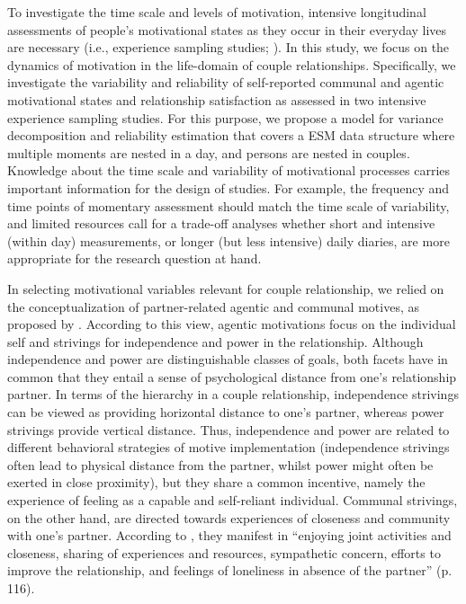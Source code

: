 \documentclass[jou,a4paper,draftfirst]{apa6}\usepackage[]{graphicx}\usepackage[]{color}
\begin{document}
To investigate the time scale and levels of motivation, intensive longitudinal assessments of people’s motivational states as they occur in their everyday lives are necessary (i.e., experience sampling studies; ).
In this study, we focus on the dynamics of motivation in the life-domain of couple relationships. Specifically, we investigate the variability and reliability of self-reported communal and agentic motivational states and relationship satisfaction as assessed in two intensive experience sampling studies. For this purpose, we propose a model for variance decomposition and reliability estimation that covers a ESM data structure where multiple moments are nested in a day, and persons are nested in couples. 
Knowledge about the time scale and variability of motivational processes carries important information for the design of studies. For example, the frequency and time points of momentary assessment should match the time scale of variability, and limited resources call for a trade-off analyses whether short and intensive (within day) measurements, or longer (but less intensive) daily diaries, are more appropriate for the research question at hand.

In selecting motivational variables relevant for couple relationship, we relied on the conceptualization of partner-related agentic and communal motives, as proposed by \textcite{hagemeyer_AssessingImplicitMotivational_2012}. According to this view, agentic motivations focus on the individual self and strivings for independence and power in the relationship. Although independence and power are distinguishable classes of goals, both facets have in common that they entail a sense of psychological distance from one’s relationship partner. 
In terms of the hierarchy in a couple relationship, independence strivings can be viewed as providing horizontal distance to one’s partner, whereas power strivings provide vertical distance. Thus, independence and power are related to different behavioral strategies of motive implementation (independence strivings often lead to physical distance from the partner, whilst power might often be exerted in close proximity), but they share a common incentive, namely the experience of feeling as a capable and self-reliant individual. Communal strivings, on the other hand, are directed towards experiences of closeness and community with one’s partner. According to \textcite{hagemeyer_AssessingImplicitMotivational_2012}, they manifest in ``enjoying joint activities and closeness, sharing of experiences and resources, sympathetic concern, efforts to improve the relationship, and feelings of loneliness in absence of the partner'' (p. 116).
\end{document}
